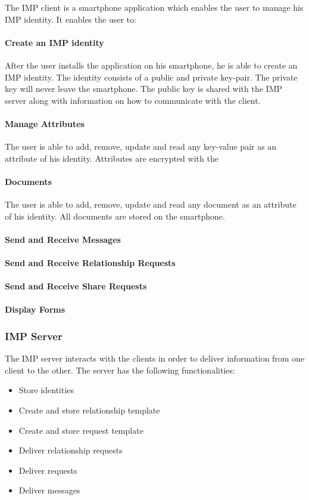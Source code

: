 The IMP client is a smartphone application which enables the user to manage his IMP identity. It enables the user to:

\paragraph{Create an IMP identity}

After the user installs the application on his smartphone, he is able to create an IMP identity. The identity consists of a public and private key-pair. The private key will never leave the smartphone. The public key is shared with the IMP server along with information on how to communicate with the client.

\paragraph{Manage Attributes}

The user is able to add, remove, update and read any key-value pair as an attribute of his identity. Attributes are encrypted with the 

\paragraph{Documents}

The user is able to add, remove, update and read any document as an attribute of his identity. All documents are stored on the smartphone. 

\paragraph{Send and Receive Messages}
\paragraph{Send and Receive Relationship Requests}
\paragraph{Send and Receive Share Requests}
\paragraph{Display Forms}

\subsubsection{IMP Server}
The IMP server interacts with the clients in order to deliver information from one client to the other. The server has the following functionalities:
\begin{itemize}
    \item Store identities
    \item Create and store relationship template
    \item Create and store request template
    \item Deliver relationship requests
    \item Deliver requests
    \item Deliver messages
\end{itemize}

